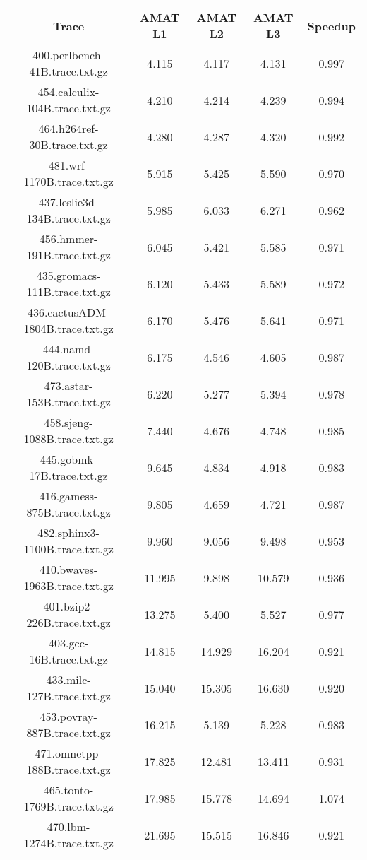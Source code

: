 \begin{table}[H]
\centering
\begin{tabular}{|c|c|c|c|c|}
\hline
Trace & AMAT L1 & AMAT L2 & AMAT L3 & Speedup\\
\hline
400.perlbench-41B.trace.txt.gz & 4.115 & 4.117 &  4.131 & 0.997\\\hline
454.calculix-104B.trace.txt.gz & 4.210 & 4.214 &  4.239 & 0.994\\\hline
464.h264ref-30B.trace.txt.gz & 4.280 & 4.287 &  4.320 & 0.992\\\hline
481.wrf-1170B.trace.txt.gz & 5.915 & 5.425 &  5.590 & 0.970\\\hline
437.leslie3d-134B.trace.txt.gz & 5.985 & 6.033 &  6.271 & 0.962\\\hline
456.hmmer-191B.trace.txt.gz & 6.045 & 5.421 &  5.585 & 0.971\\\hline
435.gromacs-111B.trace.txt.gz & 6.120 & 5.433 &  5.589 & 0.972\\\hline
436.cactusADM-1804B.trace.txt.gz & 6.170 & 5.476 &  5.641 & 0.971\\\hline
444.namd-120B.trace.txt.gz & 6.175 & 4.546 &  4.605 & 0.987\\\hline
473.astar-153B.trace.txt.gz & 6.220 & 5.277 &  5.394 & 0.978\\\hline
458.sjeng-1088B.trace.txt.gz & 7.440 & 4.676 &  4.748 & 0.985\\\hline
445.gobmk-17B.trace.txt.gz & 9.645 & 4.834 &  4.918 & 0.983\\\hline
416.gamess-875B.trace.txt.gz & 9.805 & 4.659 &  4.721 & 0.987\\\hline
482.sphinx3-1100B.trace.txt.gz & 9.960 & 9.056 &  9.498 & 0.953\\\hline
410.bwaves-1963B.trace.txt.gz & 11.995 & 9.898 &  10.579 & 0.936\\\hline
401.bzip2-226B.trace.txt.gz & 13.275 & 5.400 &  5.527 & 0.977\\\hline
403.gcc-16B.trace.txt.gz & 14.815 & 14.929 &  16.204 & 0.921\\\hline
433.milc-127B.trace.txt.gz & 15.040 & 15.305 &  16.630 & 0.920\\\hline
453.povray-887B.trace.txt.gz & 16.215 & 5.139 &  5.228 & 0.983\\\hline
471.omnetpp-188B.trace.txt.gz & 17.825 & 12.481 &  13.411 & 0.931\\\hline
465.tonto-1769B.trace.txt.gz & 17.985 & 15.778 &  14.694 & 1.074\\\hline
470.lbm-1274B.trace.txt.gz & 21.695 & 15.515 &  16.846 & 0.921\\\hline

\end{tabular}
\end{table}
